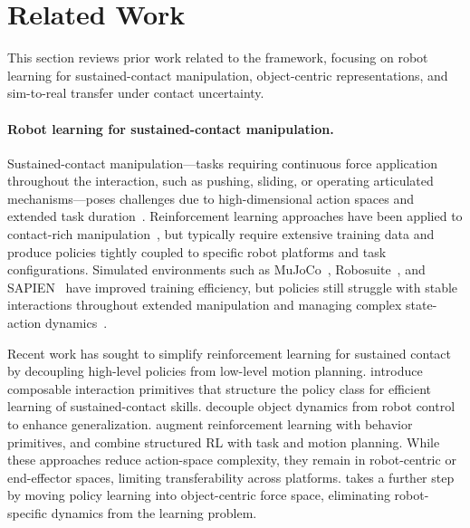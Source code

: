 \section{Related Work}
\label{sec:flex_related_work}

This section reviews prior work related to the \FLEX{} framework, focusing on robot learning for sustained-contact manipulation, object-centric representations, and sim-to-real transfer under contact uncertainty.

\paragraph{Robot learning for sustained-contact manipulation.}
Sustained-contact manipulation---tasks requiring continuous force application throughout the interaction, such as pushing, sliding, or operating articulated mechanisms---poses challenges due to high-dimensional action spaces and extended task duration~\citep{kroemer2021review}. Reinforcement learning approaches have been applied to contact-rich manipulation~\citep{gu2017deep,kalashnikov2018scalable}, but typically require extensive training data and produce policies tightly coupled to specific robot platforms and task configurations. Simulated environments such as MuJoCo~\citep{todorov2012mujoco}, Robosuite~\citep{zhu2020robosuite}, and SAPIEN~\citep{xiang2020sapien} have improved training efficiency, but policies still struggle with stable interactions throughout extended manipulation and managing complex state-action dynamics~\citep{elguea2023review}.

Recent work has sought to simplify reinforcement learning for sustained contact by decoupling high-level policies from low-level motion planning. \citet{abbatematteo2024composable} introduce composable interaction primitives that structure the policy class for efficient learning of sustained-contact skills. \citet{lu2023decoupling} decouple object dynamics from robot control to enhance generalization. \citet{nasiriany2022augmenting} augment reinforcement learning with behavior primitives, and \citet{rosen2022role} combine structured RL with task and motion planning. While these approaches reduce action-space complexity, they remain in robot-centric or end-effector spaces, limiting transferability across platforms. \FLEX{} takes a further step by moving policy learning into object-centric force space, eliminating robot-specific dynamics from the learning problem.


